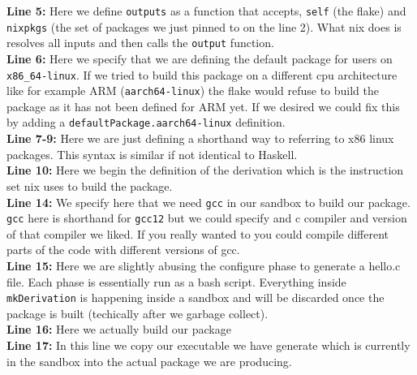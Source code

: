 \textbf{Line 5:} Here we define \texttt{outputs} as a function that accepts, \texttt{self} (the flake) and \texttt{nixpkgs} (the set of packages we just pinned to on the line 2). What nix does is resolves all inputs and then calls the \texttt{output} function.\\

\textbf{Line 6:} Here we specify that we are defining the default package for users on \texttt{x86\_64-linux}. If we tried to build this package on a different cpu architecture like for example ARM (\texttt{aarch64-linux}) the flake would refuse to build the package  as it has not been defined for ARM yet. If we desired we could fix this by adding a \texttt{defaultPackage.aarch64-linux} definition.\\

\textbf{Line 7-9:} Here we are just defining a shorthand way to referring to x86 linux packages. This syntax is similar if not identical to Haskell.\\

\textbf{Line 10:} Here we begin the definition of the derivation which is the instruction set nix uses to build the package.\\

\textbf{Line 14:} We specify here that we need \texttt{gcc} in our sandbox to build our package. \texttt{gcc} here is shorthand for \texttt{gcc12} but we could specify and c compiler and version of that compiler we liked. If you really wanted to you could compile different parts of the code with different versions of gcc.\\

\textbf{Line 15:} Here we are slightly abusing the configure phase to generate a hello.c file. Each phase is essentially run as a bash script. Everything inside \texttt{mkDerivation} is happening inside a sandbox and will be discarded once the package is built (techically after we garbage collect). \\

\textbf{Line 16:} Here we actually build our package \\

\textbf{Line 17:} In this line we copy our executable we have generate which is currently in the sandbox into the actual package we are producing. \\ 
